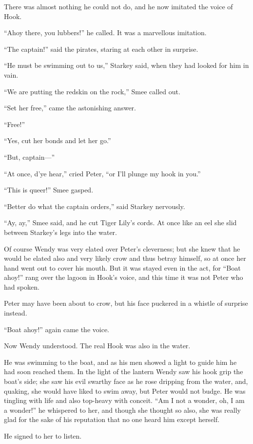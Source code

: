 There was almost nothing he could not do, and he now imitated the voice
of Hook.

``Ahoy there, you lubbers!'' he called. It was a marvellous imitation.

``The captain!'' said the pirates, staring at each other in surprise.

``He must be swimming out to us,'' Starkey said, when they had looked for
him in vain.

``We are putting the redskin on the rock,'' Smee called out.

``Set her free,'' came the astonishing answer.

``Free!''

``Yes, cut her bonds and let her go.''

``But, captain---''

``At once, d'ye hear,'' cried Peter, ``or I'll plunge my hook in you.''

``This is queer!'' Smee gasped.

``Better do what the captain orders,'' said Starkey nervously.

``Ay, ay,'' Smee said, and he cut Tiger Lily's cords. At once like an eel
she slid between Starkey's legs into the water.

Of course Wendy was very elated over Peter's cleverness; but she knew
that he would be elated also and very likely crow and thus betray
himself, so at once her hand went out to cover his mouth. But it was
stayed even in the act, for ``Boat ahoy!'' rang over the lagoon in Hook's
voice, and this time it was not Peter who had spoken.

Peter may have been about to crow, but his face puckered in a whistle
of surprise instead.

``Boat ahoy!'' again came the voice.

Now Wendy understood. The real Hook was also in the water.

He was swimming to the boat, and as his men showed a light to guide him
he had soon reached them. In the light of the lantern Wendy saw his
hook grip the boat's side; she saw his evil swarthy face as he rose
dripping from the water, and, quaking, she would have liked to swim
away, but Peter would not budge. He was tingling with life and also
top-heavy with conceit. ``Am I not a wonder, oh, I am a wonder!'' he
whispered to her, and though she thought so also, she was really glad
for the sake of his reputation that no one heard him except herself.

He signed to her to listen.

